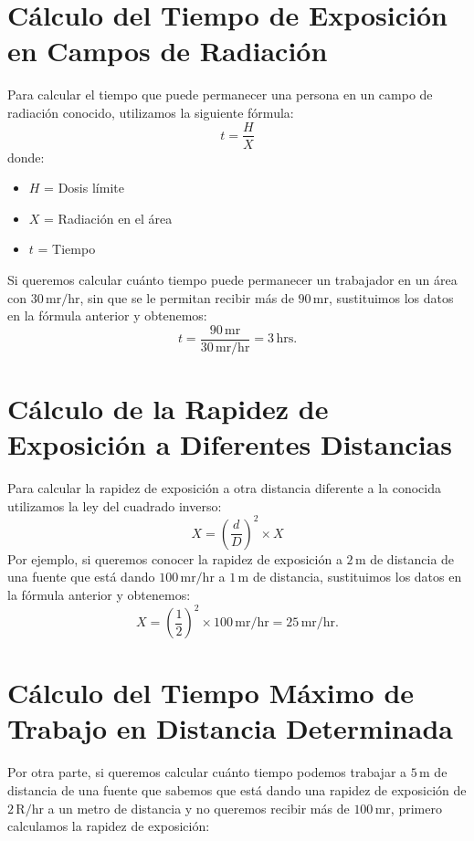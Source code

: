\section*{Cálculo del Tiempo de Exposición en Campos de Radiación}

Para calcular el tiempo que puede permanecer una persona en un campo de radiación conocido, utilizamos la siguiente fórmula:
%
\[
t = \frac{H}{X}
\]
%
donde:
\begin{itemize}
  \item \( H \) = Dosis límite
  \item \( X \) = Radiación en el área
  \item \( t \) = Tiempo
\end{itemize}

Si queremos calcular cuánto tiempo puede permanecer un trabajador en un área con \( 30 \, \text{mr/hr} \), sin que se le permitan recibir más de \( 90 \, \text{mr} \), sustituimos los datos en la fórmula anterior y obtenemos:
%
\[
t = \frac{90 \, \text{mr}}{30 \, \text{mr/hr}} = 3 \, \text{hrs.}
\]

\section*{Cálculo de la Rapidez de Exposición a Diferentes Distancias}

Para calcular la rapidez de exposición a otra distancia diferente a la conocida utilizamos la ley del cuadrado inverso:
%
\[
X = \left(\frac{d}{D}\right)^2 \times X
\]
%
Por ejemplo, si queremos conocer la rapidez de exposición a \( 2 \, \text{m} \) de distancia de una fuente que está dando \( 100 \, \text{mr/hr} \) a \( 1 \, \text{m} \) de distancia, sustituimos los datos en la fórmula anterior y obtenemos:
%
\[
X = \left(\frac{1}{2}\right)^2 \times 100 \, \text{mr/hr} = 25 \, \text{mr/hr.}
\]

\section*{Cálculo del Tiempo Máximo de Trabajo en Distancia Determinada}

Por otra parte, si queremos calcular cuánto tiempo podemos trabajar a \( 5 \, \text{m} \) de distancia de una fuente que sabemos que está dando una rapidez de exposición de \( 2 \, \text{R/hr} \) a un metro de distancia y no queremos recibir más de \( 100 \, \text{mr} \), primero calculamos la rapidez de exposición:
%
